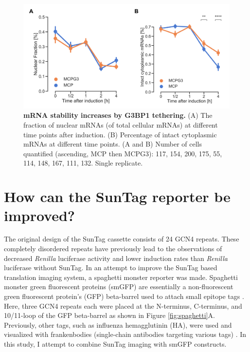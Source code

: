 \begin{figure}[h]
    \centering
    \includegraphics[width=\linewidth]{images/figure5}
    \caption{\textbf{mRNA stability increases by G3BP1 tethering.}
        (A) The fraction of nuclear mRNAs (of total cellular mRNAs)
            at different time points after induction.
        (B) Percentage of intact cytoplasmic mRNAs at different time points.
        (A and B) Number of cells quantified (ascending, MCP then MCPG3):
            117, 154, 200, 175, 55, 114, 148, 167, 111, 132. Single replicate.
    }
    \label{fig:mcp_treat}
\end{figure}


\section{How can the SunTag reporter be improved?} \label{spaghetti}

The original design of the SunTag cassette consists of 24 GCN4 repeats.
These completely disordered repeats have previously lead to the observations of decreased \textit{Renilla} luciferase activity and lower induction rates than \textit{Renilla} luciferase without SunTag.
In an attempt to improve the SunTag based translation imaging system, a spaghetti monster reporter was made.
Spaghetti monster green fluorescent proteins (smGFP) are essentially a non-fluorescent green fluorescent protein's (GFP) beta-barrel used to attach small epitope tags \cite{viswanathan_high-performance_2015}.
Here, three GCN4 repeats each were placed at the N-terminus, C-terminus, and 10/11-loop of the GFP beta-barrel as shown in Figure \ref{fig:spaghetti}A.
Previously, other tags, such as influenza hemagglutinin (HA), were used and visualized with frankenbodies (single-chain antibodies targeting various tags) \cite{zhao_genetically_2019}.
In this study, I attempt to combine SunTag imaging with smGFP constructs.

